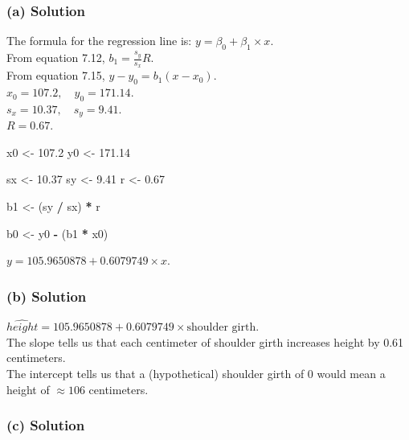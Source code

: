 \documentclass[]{article}
\newenvironment{Shaded}{\begin{snugshade}}{\end{snugshade}}
\newcommand{\FloatTok}[1]{\textcolor[rgb]{0.00,0.00,0.81}{#1}}
\newcommand{\StringTok}[1]{\textcolor[rgb]{0.31,0.60,0.02}{#1}}
\newcommand{\OperatorTok}[1]{\textcolor[rgb]{0.81,0.36,0.00}{\textbf{#1}}}
\newcommand{\NormalTok}[1]{#1}
\begin{document}
\subsubsection{(a) Solution}\label{a-solution-1}

The formula for the regression line is:
\(y = \beta_0 +\beta_1 \times x\).\\
From equation 7.12, \(b_1 = \frac{s_y}{s_x}R\).\\
From equation 7.15, \(y - y_0 = b_1(x - x_0)\).\\
\(x_0 = 107.2, \quad y_0 = 171.14\).\\
\(s_x = 10.37, \quad s_y = 9.41\).\\
\(R = 0.67\).

\begin{Shaded}
\begin{Highlighting}[]
\NormalTok{x0 <-}\StringTok{ }\FloatTok{107.2}
\NormalTok{y0 <-}\StringTok{ }\FloatTok{171.14}

\NormalTok{sx <-}\StringTok{ }\FloatTok{10.37}
\NormalTok{sy <-}\StringTok{ }\FloatTok{9.41}
\NormalTok{r <-}\StringTok{ }\FloatTok{0.67}

\NormalTok{b1 <-}\StringTok{ }\NormalTok{(sy }\OperatorTok{/}\StringTok{ }\NormalTok{sx) }\OperatorTok{*}\StringTok{ }\NormalTok{r}

\NormalTok{b0 <-}\StringTok{ }\NormalTok{y0 }\OperatorTok{-}\StringTok{ }\NormalTok{(b1 }\OperatorTok{*}\StringTok{ }\NormalTok{x0)}
\end{Highlighting}
\end{Shaded}

\(y = 105.9650878 + 0.6079749\times x\).

\subsubsection{(b) Solution}\label{b-solution-1}

\(\widehat{height} = 105.9650878 + 0.6079749\times \text{shoulder girth}\).\\
The slope tells us that each centimeter of shoulder girth increases
height by 0.61 centimeters.\\
The intercept tells us that a (hypothetical) shoulder girth of 0 would
mean a height of \(\approx 106\) centimeters.

\subsubsection{(c) Solution}\label{c-solution-1}
\end{document}

